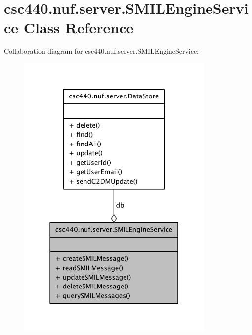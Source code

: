 \hypertarget{classcsc440_1_1nuf_1_1server_1_1_s_m_i_l_engine_service}{\section{csc440.\-nuf.\-server.\-S\-M\-I\-L\-Engine\-Service Class Reference}
\label{classcsc440_1_1nuf_1_1server_1_1_s_m_i_l_engine_service}
}


Collaboration diagram for csc440.\-nuf.\-server.\-S\-M\-I\-L\-Engine\-Service\-:
\nopagebreak
\begin{figure}[H]
\begin{center}
\leavevmode
\includegraphics[width=274pt]{classcsc440_1_1nuf_1_1server_1_1_s_m_i_l_engine_service__coll__graph}
\end{center}
\end{figure}
